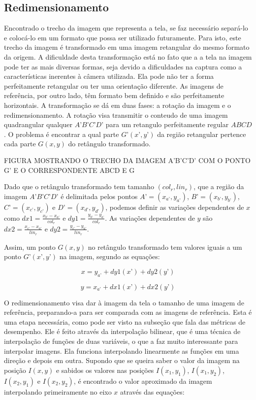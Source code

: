 \subsection{Redimensionamento} \label{redim}

Encontrado o trecho da imagem que representa a tela, se faz necessário separá-lo e colocá-lo em um formato que possa ser utilizado futuramente. Para isto, este trecho da imagem é transformado em uma imagem retangular do mesmo formato da origem. A dificuldade desta transformação está no fato que a a tela na imagem pode ter as mais diversas formas, seja devido a dificuldades na captura como a características inerentes à câmera utilizada. Ela pode não ter a forma perfeitamente retangular ou ter uma orientação diferente. As imagens de referência, por outro lado, têm formato bem definido e são perfeitamente horizontais.
A transformação se dá em duas fases: a rotação da imagem e o redimensionamento. A rotação visa transmitir o conteudo de uma imagem quadrangular qualquer $A’B’C’D’$ para um retangulo perfeitamente regular $ABCD$. O problema é encontrar a qual parte $G’(x’,y’)$ da região retangular pertence cada parte $G(x,y)$ do retângulo transformado.

FIGURA MOSTRANDO O TRECHO DA IMAGEM A’B’C’D’ COM O PONTO G’ E O CORRESPONDENTE ABCD E G

Dado que o retângulo transformado tem tamanho $(col_r,lin_r)$, que a região da imagem $A’B’C’D’$ é delimitada pelos pontos $A’ = (x_{a’},y_{a’})$, $B’ = (x_{b’},y_{b’})$, $C’ = (x_{c’},y_{c’})$ e $D’ = (x_{d’},y_{d’})$, podemos definir as variações dependentes de $x$ como $dx1 = \frac{x_{b’}-x_{a’}}{col_r}$ e $dy1 = \frac{y_{b’}-y_{a’}}{col_r}$. As variações dependentes de $y$ são $dx2 = \frac{x_{c’}-x_{a’}}{lin_r}$ e $dy2 = \frac{y_{c’}-y_{a’}}{lin_r}$.


Assim, um ponto $G(x,y)$ no retângulo transformado tem valores iguais a um ponto $G’(x’,y’)$ na imagem, segundo as equações:

$$ x = y_{a’} + dy1(x’) + dy2(y’) $$

$$ y = x_{a’} + dx1(x’) + dx2(y’) $$

O redimensionamento visa dar à imagem da tela o tamanho de uma imagem de referência, preparando-a para ser comparada com as imagens de referência. Esta é uma etapa necessária, como pode ser visto na subseção que fala das métricas de desempenho. Ele é feito através da interpolação bilinear, que é uma técnica de interpolação de funções de duas variáveis, o que a faz muito interessante para interpolar imagens.
Ela funciona interpolando linearmente as funções em uma direção e depois em outra. Supondo que se queira saber o valor da imagem na posição $I(x,y)$ e sabidos os valores nas posições $I(x_1,y_1)$, $I(x_1,y_2)$, $I(x_2,y_1)$ e $I(x_2,y_2)$, é encontrado o valor aproximado da imagem interpolando primeiramente no eixo $x$ através das equações:

